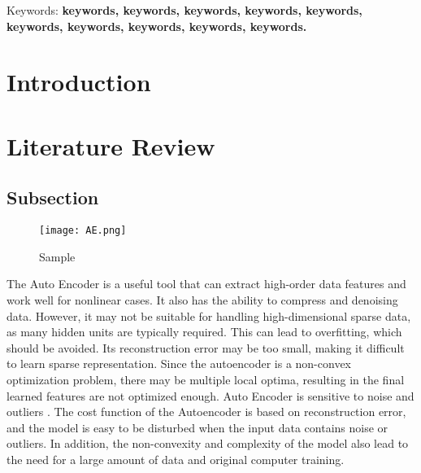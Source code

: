 \documentclass{scrartcl}
\begin{document}
\begin{keywords}
\centering
 Keywords: \textbf{keywords, keywords, keywords, keywords, keywords, keywords, keywords, keywords, keywords, keywords.}
\end{keywords}

\newpage

\tableofcontents
\newpage
\onehalfspacing

\section{Introduction}



\newpage

\section{Literature Review}



\subsection{Subsection}

\begin{figure}[H]
	\begin{center}
		\texttt{[image: AE.png]}
	\end{center}
	\caption{Sample}
	\label{fig:AE}
\end{figure}

The Auto Encoder is a useful tool that can extract high-order data features and work well for nonlinear cases. It also has the ability to compress and denoising data. However, it may not be suitable for handling high-dimensional sparse data, as many hidden units are typically required. This can lead to overfitting, which should be avoided. Its reconstruction error may be too small, making it difficult to learn sparse representation. Since the autoencoder is a non-convex optimization problem, there may be multiple local optima, resulting in the final learned features are not optimized enough. Auto Encoder is sensitive to noise and outliers \cite{cheng2018deep}. The cost function of the Autoencoder is based on reconstruction error, and the model is easy to be disturbed when the input data contains noise or outliers. In addition, the non-convexity and complexity of the model also lead to the need for a large amount of data and original computer training.
\end{document}

